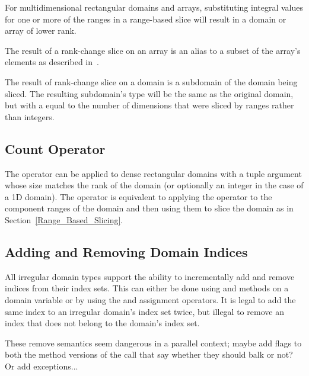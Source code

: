 For multidimensional rectangular domains and arrays, substituting
integral values for one or more of the ranges in a range-based slice
will result in a domain or array of lower rank.

The result of a rank-change slice on an array is an alias to a subset
of the array's elements as described
in~.

The result of rank-change slice on a domain is a subdomain of the
domain being sliced.  The resulting
subdomain's type will be the same as the original domain, but with
a  equal to the number of dimensions that were sliced by
ranges rather than integers.


\subsection{Count Operator}
\label{Count_Operator_Domains}
The \chpl{#} operator can be applied to dense rectangular domains with
a tuple argument whose size matches the rank of the domain (or
optionally an integer in the case of a 1D domain).  The operator is
equivalent to applying the \chpl{#} operator to the component ranges
of the domain and then using them to slice the domain as in
Section~\ref{Range_Based_Slicing}.


\subsection{Adding and Removing Domain Indices}
\label{Adding_and_Removing_Domain_Indices}

All irregular domain types support the ability to incrementally add
and remove indices from their index sets.  This can either be done
using  and  methods on a
domain variable or by using the \chpl{+=} and \chpl{-=} assignment
operators.  It is legal to add the same index to an irregular domain's
index set twice, but illegal to remove an index that does not belong
to the domain's index set.

\begin{openissue}
These remove semantics seem dangerous in a parallel context; maybe
add flags to both the method versions of the call that say whether
they should balk or not?  Or add exceptions...
\end{openissue}

